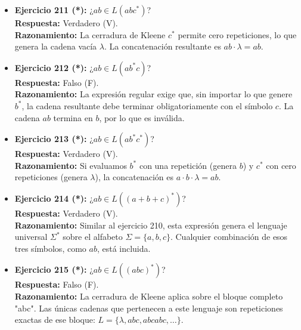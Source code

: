 \documentclass[12pt]{article}
\begin{document}
\begin{itemize}
    \vspace{0.2cm}
    \item \textbf{Ejercicio 211 (*):} ¿$ab \in L(abc^*)$? \\
    \textbf{Respuesta:} Verdadero (V). \\
    \textbf{Razonamiento:} La cerradura de Kleene $c^*$ permite cero repeticiones, lo que genera la cadena vacía $\lambda$. La concatenación resultante es $ab \cdot \lambda = ab$.
    
    \vspace{0.2cm}
    \item \textbf{Ejercicio 212 (*):} ¿$ab \in L(ab^*c)$? \\
    \textbf{Respuesta:} Falso (F). \\
    \textbf{Razonamiento:} La expresión regular exige que, sin importar lo que genere $b^*$, la cadena resultante debe terminar obligatoriamente con el símbolo $c$. La cadena $ab$ termina en $b$, por lo que es inválida.
    
    \vspace{0.2cm}
    \item \textbf{Ejercicio 213 (*):} ¿$ab \in L(ab^*c^*)$? \\
    \textbf{Respuesta:} Verdadero (V). \\
    \textbf{Razonamiento:} Si evaluamos $b^*$ con una repetición (genera $b$) y $c^*$ con cero repeticiones (genera $\lambda$), la concatenación es $a \cdot b \cdot \lambda = ab$.
    
    \vspace{0.2cm}
    \item \textbf{Ejercicio 214 (*):} ¿$ab \in L((a+b+c)^*)$? \\
    \textbf{Respuesta:} Verdadero (V). \\
    \textbf{Razonamiento:} Similar al ejercicio 210, esta expresión genera el lenguaje universal $\Sigma^*$ sobre el alfabeto $\Sigma = \{a, b, c\}$. Cualquier combinación de esos tres símbolos, como $ab$, está incluida.
    
    \vspace{0.2cm}
    \item \textbf{Ejercicio 215 (*):} ¿$ab \in L((abc)^*)$? \\
    \textbf{Respuesta:} Falso (F). \\
    \textbf{Razonamiento:} La cerradura de Kleene aplica sobre el bloque completo "abc". Las únicas cadenas que pertenecen a este lenguaje son repeticiones exactas de ese bloque: $L = \{\lambda, abc, abcabc, \dots\}$.
    

\end{itemize}
\end{document}

